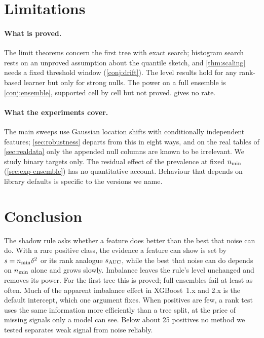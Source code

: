 \section{Limitations}\label{sec:limitations}

\paragraph{What is proved.} The limit theorems concern the first tree with exact search; histogram search rests on an unproved assumption about the quantile sketch, and \cref{thm:scaling} needs a fixed threshold window (\cref{conj:drift}). The level results hold for any rank-based learner but only for strong nulls. The power on a full ensemble is \cref{conj:ensemble}, supported cell by cell but not proved.  gives no rate.

\paragraph{What the experiments cover.} The main sweeps use Gaussian location shifts with conditionally independent features; \cref{sec:robustness} departs from this in eight ways, and on the real tables of \cref{sec:realdata} only the appended null columns are known to be irrelevant. We study binary targets only. The residual effect of the prevalence at fixed $n_{\min}$ (\cref{sec:exp-ensemble}) has no quantitative account. Behaviour that depends on library defaults is specific to the versions we name.

\section{Conclusion}\label{sec:conclusion}

The shadow rule asks whether a feature does better than the best that noise can do. With a rare positive class, the evidence a feature can show is set by $s = n_{\min}\delta^2$ or its rank analogue $s_{\mathrm{AUC}}$, while the best that noise can do depends on $n_{\min}$ alone and grows slowly. Imbalance leaves the rule's level unchanged and removes its power. For the first tree this is proved; full ensembles fail at least as often. Much of the apparent imbalance effect in XGBoost~1.x and 2.x is the default intercept, which one argument fixes. When positives are few, a rank test uses the same information more efficiently than a tree split, at the price of missing signals only a model can see. Below about 25 positives no method we tested separates weak signal from noise reliably.
